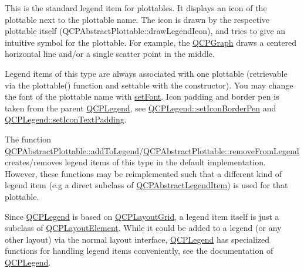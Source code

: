 \-This is the standard legend item for plottables. \-It displays an icon of the plottable next to the plottable name. \-The icon is drawn by the respective plottable itself (\-Q\-C\-P\-Abstract\-Plottable\-::draw\-Legend\-Icon), and tries to give an intuitive symbol for the plottable. \-For example, the \hyperlink{classQCPGraph}{\-Q\-C\-P\-Graph} draws a centered horizontal line and/or a single scatter point in the middle.

\-Legend items of this type are always associated with one plottable (retrievable via the plottable() function and settable with the constructor). \-You may change the font of the plottable name with \hyperlink{classQCPAbstractLegendItem_a409c53455d8112f71d70c0c43eb10265}{set\-Font}. \-Icon padding and border pen is taken from the parent \hyperlink{classQCPLegend}{\-Q\-C\-P\-Legend}, see \hyperlink{classQCPLegend_a2f2c93d18a651f4ff294bb3f026f49b8}{\-Q\-C\-P\-Legend\-::set\-Icon\-Border\-Pen} and \hyperlink{classQCPLegend_a62973bd69d5155e8ea3141366e8968f6}{\-Q\-C\-P\-Legend\-::set\-Icon\-Text\-Padding}.

\-The function \hyperlink{classQCPAbstractPlottable_a70f8cabfd808f7d5204b9f18c45c13f5}{\-Q\-C\-P\-Abstract\-Plottable\-::add\-To\-Legend}/\hyperlink{classQCPAbstractPlottable_aa1f350e510326d012b9a9c9249736c83}{\-Q\-C\-P\-Abstract\-Plottable\-::remove\-From\-Legend} creates/removes legend items of this type in the default implementation. \-However, these functions may be reimplemented such that a different kind of legend item (e.\-g a direct subclass of \hyperlink{classQCPAbstractLegendItem}{\-Q\-C\-P\-Abstract\-Legend\-Item}) is used for that plottable.

\-Since \hyperlink{classQCPLegend}{\-Q\-C\-P\-Legend} is based on \hyperlink{classQCPLayoutGrid}{\-Q\-C\-P\-Layout\-Grid}, a legend item itself is just a subclass of \hyperlink{classQCPLayoutElement}{\-Q\-C\-P\-Layout\-Element}. \-While it could be added to a legend (or any other layout) via the normal layout interface, \hyperlink{classQCPLegend}{\-Q\-C\-P\-Legend} has specialized functions for handling legend items conveniently, see the documentation of \hyperlink{classQCPLegend}{\-Q\-C\-P\-Legend}. 

